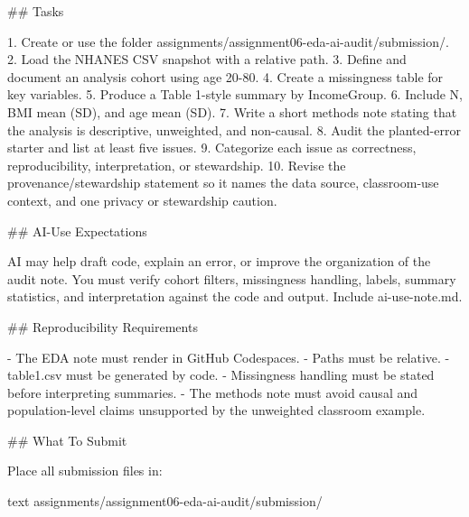 \documentclass[
  letterpaper,
  DIV=11,
  numbers=noendperiod,
  oneside]{scrreprt}
\newenvironment{Shaded}{\begin{snugshade}}{\end{snugshade}}
\newcommand{\FunctionTok}[1]{\textcolor[rgb]{0.28,0.35,0.67}{#1}}
\newcommand{\InformationTok}[1]{\textcolor[rgb]{0.37,0.37,0.37}{#1}}
\newcommand{\NormalTok}[1]{\textcolor[rgb]{0.00,0.23,0.31}{#1}}
\newcommand{\SpecialStringTok}[1]{\textcolor[rgb]{0.13,0.47,0.30}{#1}}
\begin{document}
\begin{Shaded}
\begin{Highlighting}[numbers=left,,]
\FunctionTok{\#\# Tasks}

\SpecialStringTok{1. }\NormalTok{Create or use the folder }\InformationTok{\textasciigrave{}assignments/assignment06{-}eda{-}ai{-}audit/submission/\textasciigrave{}}\NormalTok{.}
\SpecialStringTok{2. }\NormalTok{Load the NHANES CSV snapshot with a relative path.}
\SpecialStringTok{3. }\NormalTok{Define and document an analysis cohort using age 20{-}80.}
\SpecialStringTok{4. }\NormalTok{Create a missingness table for key variables.}
\SpecialStringTok{5. }\NormalTok{Produce a Table 1{-}style summary by }\InformationTok{\textasciigrave{}IncomeGroup\textasciigrave{}}\NormalTok{.}
\SpecialStringTok{6. }\NormalTok{Include N, BMI mean (SD), and age mean (SD).}
\SpecialStringTok{7. }\NormalTok{Write a short methods note stating that the analysis is descriptive, unweighted, and non{-}causal.}
\SpecialStringTok{8. }\NormalTok{Audit the planted{-}error starter and list at least five issues.}
\SpecialStringTok{9. }\NormalTok{Categorize each issue as correctness, reproducibility, interpretation, or stewardship.}
\SpecialStringTok{10. }\NormalTok{Revise the provenance/stewardship statement so it names the data source, classroom{-}use context, and one privacy or stewardship caution.}

\FunctionTok{\#\# AI{-}Use Expectations}

\NormalTok{AI may help draft code, explain an error, or improve the organization of the audit note. You must verify cohort filters, missingness handling, labels, summary statistics, and interpretation against the code and output. Include }\InformationTok{\textasciigrave{}ai{-}use{-}note.md\textasciigrave{}}\NormalTok{.}

\FunctionTok{\#\# Reproducibility Requirements}

\SpecialStringTok{{-} }\NormalTok{The EDA note must render in GitHub Codespaces.}
\SpecialStringTok{{-} }\NormalTok{Paths must be relative.}
\SpecialStringTok{{-} }\InformationTok{\textasciigrave{}table1.csv\textasciigrave{}}\NormalTok{ must be generated by code.}
\SpecialStringTok{{-} }\NormalTok{Missingness handling must be stated before interpreting summaries.}
\SpecialStringTok{{-} }\NormalTok{The methods note must avoid causal and population{-}level claims unsupported by the unweighted classroom example.}

\FunctionTok{\#\# What To Submit}

\NormalTok{Place all submission files in:}

\InformationTok{\textasciigrave{}\textasciigrave{}\textasciigrave{}text}
\InformationTok{assignments/assignment06{-}eda{-}ai{-}audit/submission/}
\InformationTok{\textasciigrave{}\textasciigrave{}\textasciigrave{}}


\end{Highlighting}
\end{Shaded}
\end{document}
